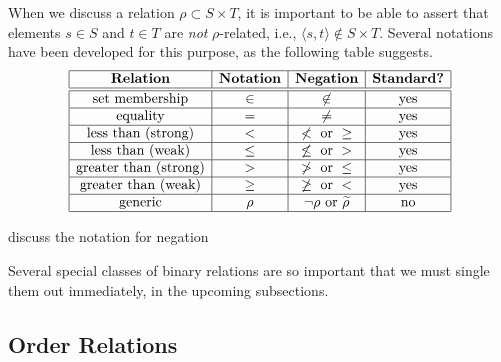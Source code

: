 \noindent
When we discuss a relation $\rho \subset S \times T$, it is important
to be able to assert that elements $s \in S$ and $t \in T$ are {\em
  not} $\rho$-related, i.e., $\langle s, t
\rangle \not\in S \times T$.  Several notations have been developed
for this purpose, as the following table suggests.
\begin{equation}
\label{eq:NOT-rho-notation}
\begin{array}{|c|c|c|c|}
\hline
\mbox{\bf Relation} & \mbox{\bf Notation} & \mbox{\bf Negation} &
\mbox{\bf Standard?} \\
\hline
\hline
\mbox{set membership} & \in & \not\in & \mbox{yes} \\
\hline
\mbox{equality}       & =   & \neq    & \mbox{yes} \\
\hline
\mbox{less than (strong)} & < & \not < \mbox{ or } \geq & \mbox{yes} \\
\hline
\mbox{less than (weak)} & \leq & \not\leq \mbox{ or } > & \mbox{yes} \\
\hline
\mbox{greater than (strong)} & > & \not > \mbox{ or } \leq & \mbox{yes} \\
\hline
\mbox{greater than (weak)} & \geq & \not\geq \mbox{ or } < & \mbox{yes} \\
\hline
\mbox{generic}  & \rho  & \neg \rho \mbox{ or } \widetilde{\rho} &
\mbox{no} \\
\hline
\end{array}
\end{equation}

\medskip

{\Denis discuss the notation for negation}

Several special classes of binary relations are so important that we
must single them out immediately, in the upcoming subsections.


\subsection{Order Relations}
\label{sec:order-relation}

